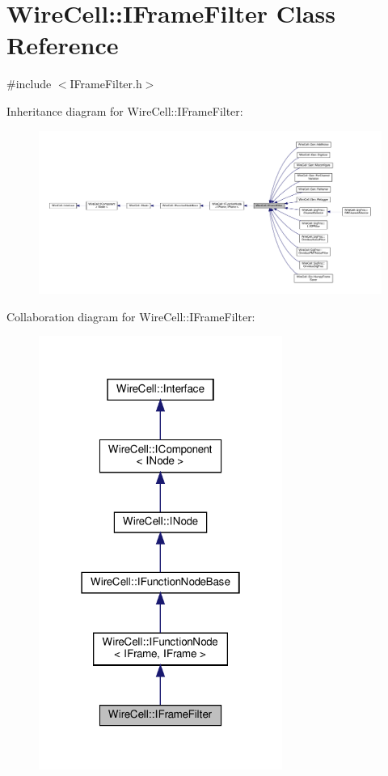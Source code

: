 \hypertarget{class_wire_cell_1_1_i_frame_filter}{}\section{Wire\+Cell\+:\+:I\+Frame\+Filter Class Reference}
\label{class_wire_cell_1_1_i_frame_filter}


{\ttfamily \#include $<$I\+Frame\+Filter.\+h$>$}



Inheritance diagram for Wire\+Cell\+:\+:I\+Frame\+Filter\+:
\nopagebreak
\begin{figure}[H]
\begin{center}
\leavevmode
\includegraphics[width=350pt]{class_wire_cell_1_1_i_frame_filter__inherit__graph}
\end{center}
\end{figure}


Collaboration diagram for Wire\+Cell\+:\+:I\+Frame\+Filter\+:
\nopagebreak
\begin{figure}[H]
\begin{center}
\leavevmode
\includegraphics[width=226pt]{class_wire_cell_1_1_i_frame_filter__coll__graph}
\end{center}
\end{figure}
